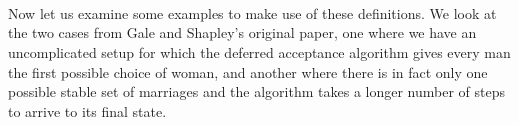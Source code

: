 {\begin{code}
\>[2540I]\AgdaSymbol{(}\AgdaSpace{}%
\AgdaSymbol{(}\AgdaSpace{}%
\AgdaSymbol{)}\AgdaSpace{}%
\AgdaOperator{\AgdaInductiveConstructor{,}}\AgdaSpace{}%
\AgdaSpace{}%
\AgdaSymbol{(}\AgdaSpace{}%
\AgdaSymbol{)}\AgdaSpace{}%
\AgdaSymbol{)}\AgdaSpace{}%
\AgdaOperator{\AgdaInductiveConstructor{,}}\<%
\\
\>[.][@{}l@{}]\<[2540I]%
\>[12]\AgdaSymbol{(}\AgdaSpace{}%
\AgdaSymbol{(}\AgdaSpace{}%
\AgdaSymbol{)}\AgdaSpace{}%
\AgdaOperator{\AgdaInductiveConstructor{,}}\AgdaSpace{}%
\AgdaSpace{}%
\AgdaSymbol{(}\AgdaSpace{}%
\AgdaSymbol{)}\AgdaSpace{}%
\AgdaSymbol{))}\<%
\\
%
\>[10]\AgdaSymbol{(}%
\>[2556I]\AgdaSymbol{(}\AgdaSpace{}%
\AgdaSymbol{(}\AgdaSpace{}%
\AgdaSymbol{)}\AgdaSpace{}%
\AgdaOperator{\AgdaInductiveConstructor{,}}\AgdaSpace{}%
\AgdaSpace{}%
\AgdaSymbol{(}\AgdaSpace{}%
\AgdaSymbol{)}\AgdaSpace{}%
\AgdaSymbol{)}\AgdaSpace{}%
\AgdaOperator{\AgdaInductiveConstructor{,}}\<%
\\
\>[.][@{}l@{}]\<[2556I]%
\>[12]\AgdaSymbol{(}\AgdaSpace{}%
\AgdaSymbol{(}\AgdaSpace{}%
\AgdaSymbol{)}\AgdaSpace{}%
\AgdaOperator{\AgdaInductiveConstructor{,}}\AgdaSpace{}%
\AgdaSpace{}%
\AgdaSymbol{(}\AgdaSpace{}%
\AgdaSymbol{)}\AgdaSpace{}%
\AgdaSymbol{)))}\<%
\end{code}

Now let us examine some examples to make use of these definitions. We look at the two cases from Gale and Shapley's original paper, one where we have an uncomplicated setup for which the deferred acceptance algorithm gives every man the first possible choice of woman, and another where there is in fact only one possible stable set of marriages and the algorithm takes a longer number of steps to arrive to its final state.

}
